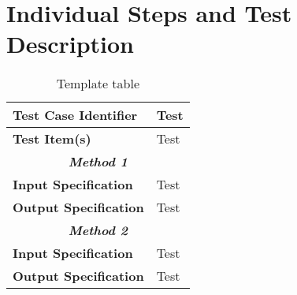 
\chapter{Individual Steps and Test Description}
\blindtext

\begin{table}[h]
	\begin{tabularx}{\textwidth}{l X}
		\hline
		\textbf{Test Case Identifier}	&	Test\\	\hline
		\textbf{Test Item(s)}			&	Test\\	\hline\hline
		\multicolumn{2}{c}{\textbf{\textit{Method 1}}}	\\	\hline
		\textbf{Input Specification}	&	Test\\	\hline
		\textbf{Output Specification}	&	Test\\	\hline\hline
				\multicolumn{2}{c}{\textbf{\textit{Method 2}}}	\\	\hline
		\textbf{Input Specification}	&	Test\\	\hline
		\textbf{Output Specification}	&	Test\\	\hline
	\end{tabularx}
	\captionsetup{textformat=empty,labelformat=blank}
	\caption{Template table}
	\label{table:template-table}
\end{table}
